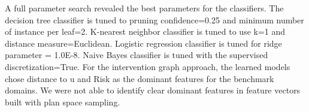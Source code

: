 \documentclass[letterpaper]{article}
\theoremstyle{plain}
\begin{document}
A full parameter search revealed the best parameters for the classifiers. The decision tree classifier is tuned to pruning confidence=0.25 and minimum number of instance per leaf=2. K-nearest neighbor classifier is tuned to use k=1 and distance measure=Euclidean. Logistic regression classifier is tuned for ridge parameter = 1.0E-8. Naive Bayes classifier is tuned with the supervised discretization=True. For the intervention graph approach, the learned models chose distance to $\mathrm{u}$ and Risk as the dominant features for the benchmark domains. We were not able to identify clear dominant features in feature vectors built with plan space sampling.

% 
 
\end{document}
